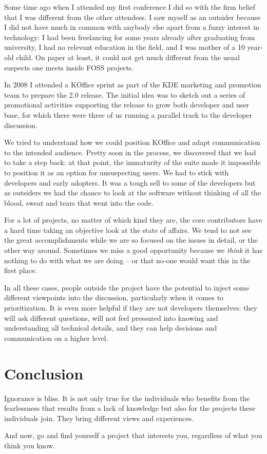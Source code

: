 Some time ago when I attended my first conference I did so with the firm belief
that I was different from the other attendees. I saw myself as an outsider
because I did not have much in common with anybody else apart from a fuzzy
interest in technology: I had been freelancing for some years already after
graduating from university, I had no relevant education in the field, and I was
mother of a 10 year-old child. On paper at least, it could not get much
different from the usual suspects one meets inside FOSS projects.

In 2008 I attended a KOffice sprint as part of the KDE marketing and promotion
team to prepare the 2.0 release. The initial idea was to sketch out a series of
promotional activities supporting the release to grow both developer and user
base, for which there were three of us running a parallel track to the developer
discussion.

We tried to understand how we could position KOffice and adapt communication to
the intended audience. Pretty soon in the process, we discovered that we had to
take a step back: at that point, the immaturity of the suite made it impossible
to position it as an option for unsuspecting users. We had to stick with
developers and early adopters. It was a tough sell to some of the developers but
as outsiders we had the chance to look at the software without thinking of all
the blood, sweat and tears that went into the code.

For a lot of projects, no matter of which kind they are, the core contributors
have a hard time taking an objective look at the state of affairs. We tend to
not see the great accomplishments while we are so focused on the issues in
detail, or the other way around. Sometimes we miss a good opportunity because we
\textit{think} it has nothing to do with what we are doing -- or that no-one
would want this in the first place.

In all these cases, people outside the project have the potential to inject some
different viewpoints into the discussion, particularly when it comes to
prioritization. It is even more helpful if they are not developers themselves:
they will ask different questions, will not feel pressured into knowing and
understanding all technical details, and they can help decisions and
communication on a higher level.

\section*{Conclusion}

Ignorance is bliss. It is not only true for the individuals who benefits from
the fearlessness that results from a lack of knowledge but also for the projects
these individuals join. They bring different views and experiences.

And now, go and find yourself a project that interests you, regardless of what
you think you know.

